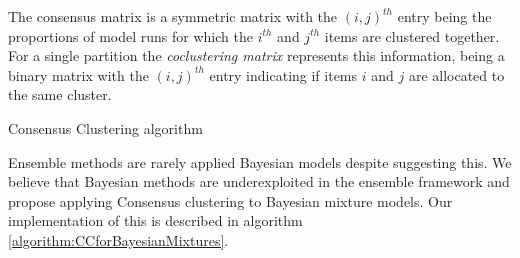 \documentclass[]{article}
\begin{document}
The consensus matrix is a symmetric matrix with the $(i, j)^{th}$ entry being the proportions of model runs for which the $i^{th}$ and $j^{th}$ items are clustered together. For a single partition the \emph{coclustering matrix} represents this information, being a binary matrix with the $(i, j)^{th}$ entry indicating if items $i$ and $j$ are allocated to the same cluster.

\begin{algorithm} \label{algorithm:CC}
	\caption{Consensus Clustering algorithm}
\end{algorithm}

Ensemble methods are rarely applied Bayesian models despite \cite{monti2003consensus} suggesting this. We believe that Bayesian methods are underexploited in the ensemble framework and propose applying Consensus clustering to Bayesian mixture models. Our implementation of this is described in algorithm \ref{algorithm:CCforBayesianMixtures}.
\end{document}
